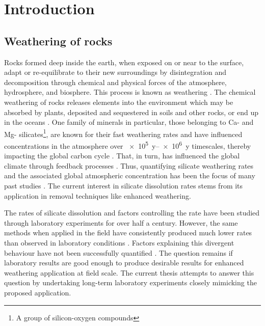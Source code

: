 
\chapter{Introduction}

\section{Weathering of rocks}
Rocks formed deep inside the earth, when exposed on or near to the surface, adapt or re-equilibrate to their new surroundings by disintegration and decomposition through chemical and physical forces of the atmosphere, hydrosphere, and biosphere. This process is known as weathering  \citep{weathering}. The chemical weathering of rocks releases elements into the environment which may be absorbed by plants, deposited and sequestered in soils and other rocks, or end up in the oceans \citep{hellmann2012}. One family of minerals in particular, those belonging to Ca- and Mg- silicates\footnote{A group of silicon-oxygen compounds}, are known for their fast weathering rates and have influenced  concentrations in the atmosphere over \SIrange[range-units = single,range-phrase = --]{e5}{e6}{y} timescales, thereby impacting the global carbon cycle \citep{Brantley2008b}. That, in turn, has influenced the global climate through feedback processes \citep{renforth2015}. Thus, quantifying silicate weathering rates and the associated global atmospheric  concentration has been the focus of many past studies \citep{golubev2005}. The current interest in silicate dissolution rates stems from its application in  removal techniques like enhanced weathering. 

The rates of silicate dissolution and factors controlling the rate have been studied through laboratory experiments for over half a century. However, the same methods when applied in the field have consistently produced much lower rates than observed in laboratory conditions \citep{white1995}. Factors explaining this divergent behaviour have not been successfully quantified \citep{renforth2015}. The question remains if laboratory results are good enough to produce desirable results for enhanced weathering application at field scale. The current thesis attempts to answer this question by undertaking long-term laboratory experiments closely mimicking the
proposed application.

